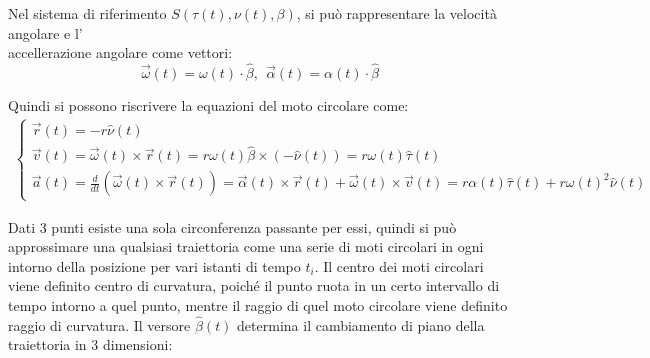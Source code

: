 \documentclass{article}
\numberwithin{equation}{subsection}
\begin{document}
\begin{center}\end{center}

Nel sistema di riferimento $S(\tau(t),\nu(t),\beta)$, 
si può rappresentare 
la velocità angolare e l'\\accellerazione angolare come vettori:
\begin{equation}
    \vec{\omega}(t)=\omega(t)\cdot\hat{\beta}{,}\:\: \vec{\alpha}(t)=\alpha(t)\cdot\hat{\beta}
\end{equation}

Quindi si possono riscrivere la equazioni del moto circolare come:
\begin{gather}
    \begin{cases}
        \vec{r}(t)=-r\hat{\nu}(t)\\
        \vec{v}(t)=\vec{\omega}(t)\times\vec{r}(t)=r\omega(t)\hat{\beta}\times(-\hat{\nu}(t))=r\omega(t)\hat{\tau}(t)\\
        \vec{a}(t)=\displaystyle\frac{d}{dt}(\vec{\omega}(t)\times\vec{r}(t))=
        \vec{\alpha}(t)\times\vec{r}(t)+\vec{\omega}(t)\times\vec{v}(t)=
        r\alpha(t)\hat{\tau}(t)+r\omega(t)^{2}\hat{\nu}(t)
    \end{cases}
\end{gather}

Dati 3 punti esiste una sola circonferenza passante per essi, 
quindi si può approssimare una qualsiasi traiettoria come una serie 
di moti circolari in ogni intorno della posizione per vari istanti di tempo $t_i$. Il centro dei moti circolari viene definito centro di curvatura, 
poiché il punto ruota in un certo intervallo di tempo intorno a quel punto, mentre il raggio di quel moto circolare viene definito raggio di curvatura. 
Il versore $\hat{\beta}(t)$ determina il cambiamento di piano della 
traiettoria in 3 dimensioni:
\end{document}
